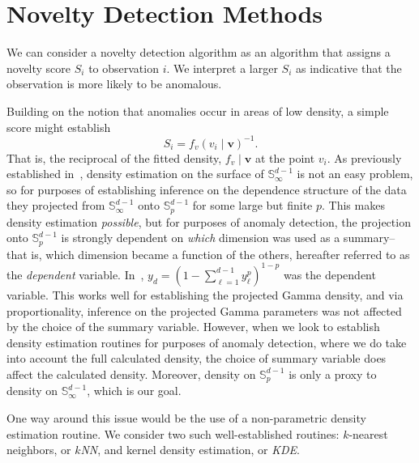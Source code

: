 \section{Novelty Detection Methods\label{sec:novelty}}
We can consider a novelty detection algorithm as an algorithm that assigns a
  novelty score $S_i$ to observation $i$.  We interpret a larger $S_i$ 
  as indicative that the observation is more likely to be anomalous.

Building on the notion that anomalies occur in areas of low density, a simple
  score might establish
  \[
      S_i = f_v(v_i\mid \bm{v})^{-1}.  
  \]
  That is, the reciprocal of the fitted density, $f_v\mid \bm{v}$ at the point $v_i$.
  As previously established in~\cite{trubey:pg}, density estimation on the 
  surface of ${\mathbb S}_{\infty}^{d-1}$ is not an easy problem, so for 
  purposes of establishing inference on the dependence structure of the data 
  they projected from ${\mathbb S}_{\infty}^{d-1}$ onto ${\mathbb S}_p^{d-1}$ for 
  some large but finite $p$.  This makes density estimation \emph{possible}, but 
  for purposes of anomaly detection, the projection onto ${\mathbb S}_p^{d-1}$ is 
  strongly dependent on \emph{which} dimension was used as a summary--that is, 
  which dimension became a function of the others, hereafter referred to as the 
  \emph{dependent} variable. In~\cite{trubey:pg}, 
  $y_d = (1 - \sum_{\ell = 1}^{d-1}y_{\ell}^p)^{1-p}$ was the dependent variable.
  This works well for establishing the projected Gamma density, and via 
  proportionality, inference on the projected Gamma parameters was not affected
  by the choice of the summary variable. However, when we look to establish 
  density estimation routines for purposes of anomaly detection, where we do 
  take into account the full calculated density, the choice of summary variable 
  does affect the calculated density.  Moreover, density on $\mathbb{S}_p^{d-1}$
  is only a proxy to density on $\mathbb{S}_{\infty}^{d-1}$, which is our goal.

One way around this issue would be the use of a non-parametric density estimation
  routine.  We consider two such well-established routines: $k$-nearest neighbors, 
  or \emph{$k$NN}, and kernel density estimation, or \emph{KDE}.

